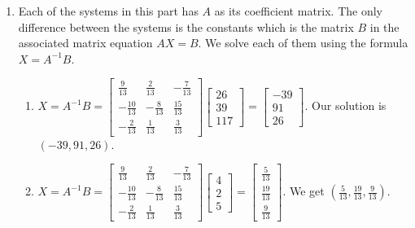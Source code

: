 \documentclass{ximera}
\begin{document}
\begin{example}
\begin{enumerate}
\item Each of the systems in this part has $A$ as its coefficient matrix.  The only difference between the systems is the constants which is the matrix $B$ in the associated matrix equation $AX=B$.  We solve each of them using the formula $X = A^{-1}B$.

\begin{enumerate}

\item $X = A^{-1}B = \left[ \begin{array}{rrr} \frac{9}{13} & \frac{2}{13} & -\frac{7}{13} \\  -\frac{10}{13} & -\frac{8}{13} & \frac{15}{13} \\  -\frac{2}{13} & \frac{1}{13} & \frac{3}{13} \end{array} \right] \left[ \begin{array}{r} 26 \\  39 \\  117 \end{array}\right] =  \left[ \begin{array}{r} -39 \\  91 \\  26 \end{array}\right]$.  Our solution is $(-39,91,26)$.

\item $X = A^{-1}B = \left[ \begin{array}{rrr} \frac{9}{13} & \frac{2}{13} & -\frac{7}{13} \\  -\frac{10}{13} & -\frac{8}{13} & \frac{15}{13} \\  -\frac{2}{13} & \frac{1}{13} & \frac{3}{13}  \end{array} \right] \left[ \begin{array}{r} 4 \\  2 \\  5 \end{array}\right] =  \left[ \begin{array}{r} \frac{5}{13} \\  \frac{19}{13} \\  \frac{9}{13} \end{array}\right]$.  We get $\left( \frac{5}{13},  \frac{19}{13},  \frac{9}{13}   \right)$.


\end{enumerate}
\end{enumerate}
\end{example}
\end{document}
